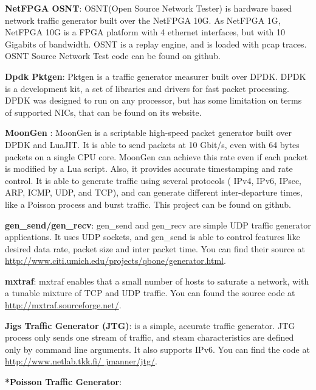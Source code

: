 \textbf{NetFPGA OSNT}\cite{web-osnt}: OSNT(Open Source Network Tester) is hardware based network traffic generator built over the NetFPGA 10G. As NetFPGA 1G, NetFPGA 10G is a FPGA platform with 4 ethernet interfaces, but with 10 Gigabits of bandwidth.  OSNT is a replay engine, and is loaded with pcap traces. OSNT Source Network Test code can be found on github.


\textbf{Dpdk Pktgen}\cite{web-dpdk-pktgen}: Pktgen is a traffic generator measurer built over DPDK. DPDK is a development kit, a set of libraries and drivers for fast packet processing. DPDK was designed to run on any processor, but has some limitation on terms of supported NICs, that can be found on its website.


\textbf{MoonGen}\cite{moongen-paper}\cite{web-moongen} : MoonGen is a scriptable high-speed packet generator built over DPDK and LuaJIT. It is able to send packets at 10 Gbit/s, even with 64 bytes packets on a single CPU core. MoonGen can achieve this rate even if each packet is modified by a Lua script. Also, it provides accurate timestamping and rate control. It is able to generate traffic using several protocols ( IPv4, IPv6, IPsec, ARP, ICMP, UDP, and  TCP), and can generate different inter-departure times, like a Poisson process and burst traffic. This project can be found on github. 

\textbf{gen\_send/gen\_recv}\cite{web-gensend-genrecv}: gen\_send and gen\_recv are simple UDP traffic generator applications. It uses UDP sockets, and  gen\_send is able to control features like desired data rate, packet size and inter packet time. You can find their source at \href{http://www.citi.umich.edu/projects/qbone/generator.html}{http://www.citi.umich.edu/projects/qbone/generator.html}. 


\textbf{mxtraf}\cite{web-mxtraf}: mxtraf enables that a small number of hosts to saturate a network, with a tunable mixture of TCP and UDP traffic. You can found the source code at \href{http://mxtraf.sourceforge.net/}{http://mxtraf.sourceforge.net/}. 

\textbf{Jigs Traffic Generator (JTG)}\cite{web-jtg}: is a simple, accurate traffic generator. JTG process only sends one stream of traffic, and steam characteristics are defined only by command line arguments. It also supports IPv6. You can find the code at \href{http://www.netlab.tkk.fi/~jmanner/jtg/}{http://www.netlab.tkk.fi/~jmanner/jtg/}. 


\textbf{*Poisson Traffic Generator}:


